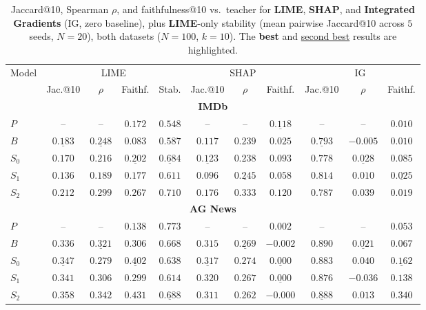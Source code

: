 \documentclass[conference]{IEEEtran}
\begin{document}
\begin{table}[tb]
\centering
\caption{Jaccard@10, Spearman $\rho$, and faithfulness@10 vs.\ teacher for \textbf{LIME}, \textbf{SHAP}, and \textbf{Integrated Gradients} (IG, zero baseline), plus \textbf{LIME}-only stability (mean pairwise Jaccard@10 across $5$ seeds, $N=20$), both datasets ($N=100$, $k=10$). The \textbf{best} and \underline{second best} results are highlighted.}
\footnotesize
\begin{tabular}{lcccccccccc}
\toprule
\multirow{2}{*}{Model} & \multicolumn{4}{c}{LIME} & \multicolumn{3}{c}{SHAP} & \multicolumn{3}{c}{IG} \\
\cmidrule(lr){2-5} \cmidrule(lr){6-8} \cmidrule(lr){9-11}
 & Jac.@10 & $\rho$ & Faithf. & Stab. & Jac.@10 & $\rho$ & Faithf. & Jac.@10 & $\rho$ & Faithf. \\
\midrule
\multicolumn{11}{c}{\textbf{IMDb}} \\
\midrule
$P$ & -- & -- & $0.172$ & $0.548$ & -- & -- & $\underline{0.118}$ & -- & -- & $0.010$ \\
$B$ & $\underline{0.183}$ & $\underline{0.248}$ & $0.083$ & $0.587$ & $0.117$ & $0.239$ & $0.025$ & $\underline{0.793}$ & $-0.005$ & $0.010$ \\
$S_0$ & $0.170$ & $0.216$ & $\underline{0.202}$ & $\underline{0.684}$ & $\underline{0.123}$ & $0.238$ & $0.093$ & $0.778$ & $\underline{0.028}$ & $\mathbf{0.085}$ \\
$S_1$ & $0.136$ & $0.189$ & $0.177$ & $0.611$ & $0.096$ & $\underline{0.245}$ & $0.058$ & $\mathbf{0.814}$ & $0.010$ & $\underline{0.025}$ \\
$S_2$ & $\mathbf{0.212}$ & $\mathbf{0.299}$ & $\mathbf{0.267}$ & $\mathbf{0.710}$ & $\mathbf{0.176}$ & $\mathbf{0.333}$ & $\mathbf{0.120}$ & $0.787$ & $\mathbf{0.039}$ & $0.019$ \\
\midrule
\multicolumn{11}{c}{\textbf{AG News}} \\
\midrule
$P$ & -- & -- & $0.138$ & $\mathbf{0.773}$ & -- & -- & $\mathbf{0.002}$ & -- & -- & $0.053$ \\
$B$ & $0.336$ & $\underline{0.321}$ & $0.306$ & $0.668$ & $0.315$ & $\underline{0.269}$ & $-0.002$ & $\mathbf{0.890}$ & $\underline{0.021}$ & $0.067$ \\
$S_0$ & $\underline{0.347}$ & $0.279$ & $\underline{0.402}$ & $0.638$ & $\underline{0.317}$ & $\mathbf{0.274}$ & $\underline{0.000}$ & $0.883$ & $\mathbf{0.040}$ & $\underline{0.162}$ \\
$S_1$ & $0.341$ & $0.306$ & $0.299$ & $0.614$ & $\mathbf{0.320}$ & $0.267$ & $\underline{0.000}$ & $0.876$ & $-0.036$ & $0.138$ \\
$S_2$ & $\mathbf{0.358}$ & $\mathbf{0.342}$ & $\mathbf{0.431}$ & $\underline{0.688}$ & $0.311$ & $0.262$ & $-0.000$ & $\underline{0.888}$ & $0.013$ & $\mathbf{0.340}$ \\
\bottomrule
\end{tabular}
\label{tab:explanation_metrics}
\end{table}
\end{document}
